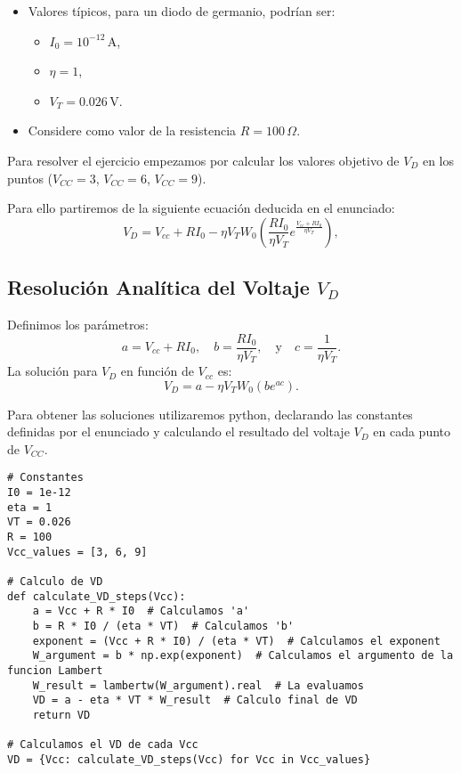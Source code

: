 \documentclass[paper=a4, fontsize=11pt]{scrartcl} %
\numberwithin{equation}{section} %
\numberwithin{figure}{section} %
\numberwithin{table}{section} %
\begin{document}
\begin{itemize}
    \item Valores típicos, para un diodo de germanio, podrían ser:
    \begin{itemize}
        \item \( I_0 = 10^{-12} \, \text{A} \),
        \item \( \eta = 1 \),
        \item \( V_T = 0.026 \, \text{V} \).
    \end{itemize}
    
    \item Considere como valor de la resistencia \( R = 100 \, \Omega \).
\end{itemize}



Para resolver el ejercicio empezamos por calcular los valores objetivo de $V_D$ en los puntos ($V_{CC} = 3$, $V_{CC} = 6$, $V_{CC} = 9$).


Para ello partiremos de la siguiente ecuación deducida en el enunciado:
\[
V_D = V_{cc} + RI_0 - \eta V_T W_0 \left( \frac{RI_0}{\eta V_T} e^{\frac{V_{cc} + RI_0}{\eta V_T}} \right),
\]

\subsection{Resolución Analítica del Voltaje $V_D$}

Definimos los parámetros:
\[
a = V_{cc} + RI_0, \quad b = \frac{R I_0}{\eta V_T}, \quad \text{y} \quad c = \frac{1}{\eta V_T}.
\]
La solución para $V_D$ en función de $V_{cc}$ es:
\[
V_D = a - \eta V_T W_0 \left( b e^{ac} \right).
\]

Para obtener las soluciones utilizaremos python, declarando las constantes definidas por el enunciado y calculando el resultado del voltaje $V_D$ en cada punto de $V_{CC}$.

\vspace{2mm}
\begin{lstlisting}
# Constantes
I0 = 1e-12
eta = 1
VT = 0.026 
R = 100
Vcc_values = [3, 6, 9]

# Calculo de VD
def calculate_VD_steps(Vcc):
    a = Vcc + R * I0  # Calculamos 'a'
    b = R * I0 / (eta * VT)  # Calculamos 'b'
    exponent = (Vcc + R * I0) / (eta * VT)  # Calculamos el exponent
    W_argument = b * np.exp(exponent)  # Calculamos el argumento de la funcion Lambert
    W_result = lambertw(W_argument).real  # La evaluamos
    VD = a - eta * VT * W_result  # Calculo final de VD
    return VD

# Calculamos el VD de cada Vcc
VD = {Vcc: calculate_VD_steps(Vcc) for Vcc in Vcc_values}
\end{lstlisting}
\vspace{2mm}
\end{document}
